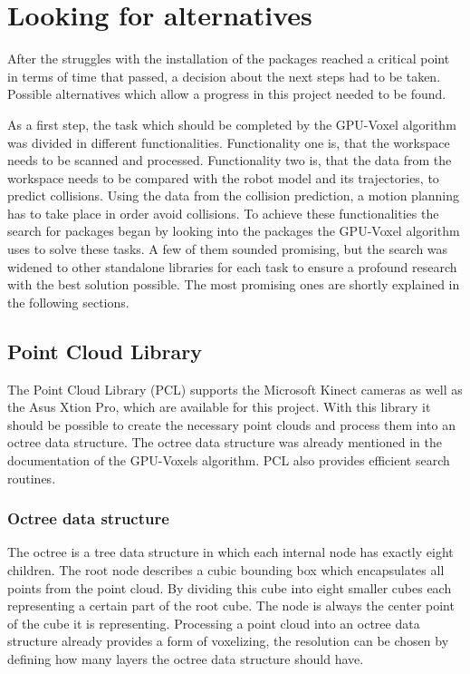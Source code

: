 \section{Looking for alternatives}
\label{chap:alternatives}

After the struggles with the installation of the packages reached a critical point in terms of time that passed, a decision about the next steps had to be taken. Possible alternatives which allow a progress in this project needed to be found.

As a first step, the task which should be completed by the GPU-Voxel algorithm was divided in different functionalities. Functionality one is, that the workspace needs to be scanned and processed. Functionality two is, that the data from the workspace needs to be compared with the robot model and its trajectories, to predict collisions. Using the data from the collision prediction, a motion planning has to take place in order avoid collisions. To achieve these functionalities the search for packages began by looking into the packages the GPU-Voxel algorithm uses to solve these tasks. A few of them sounded promising, but the search was widened to other standalone libraries for each task to ensure a profound research with the best solution possible. The most promising ones are shortly explained in the following sections.

\subsection{Point Cloud Library \cite{Rusu_ICRA2011_PCL}}
The Point Cloud Library (PCL) supports the Microsoft Kinect cameras as well as the Asus Xtion Pro, which are available for this project. With this library it should be possible to create the necessary point clouds and process them into an octree data structure. The octree data structure was already mentioned in the documentation of the GPU-Voxels algorithm. PCL also provides efficient search routines.

\subsubsection{Octree data structure}

The octree is a tree data structure in which each internal node has exactly eight children. The root node describes a cubic bounding box which encapsulates all points from the point cloud. By
dividing this cube into eight smaller cubes each representing a certain part of the root cube. The node is always the center point of the cube it is representing. Processing a point cloud into an octree data structure already provides a form of voxelizing, the resolution can be chosen by defining how many layers the octree data structure should have.

